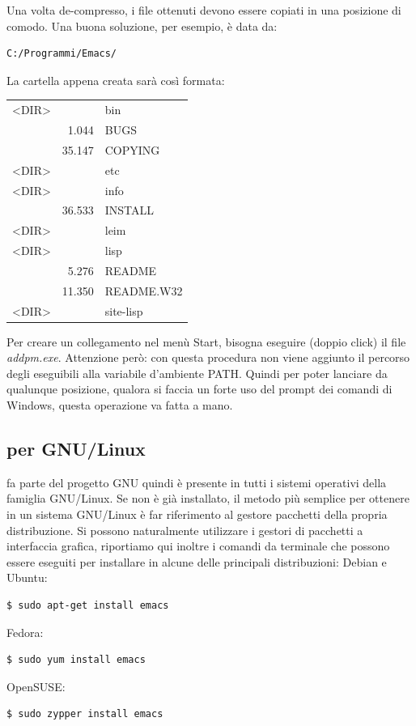 \documentclass[10pt,a4paper]{article}
\begin{document}
Una volta de-compresso, i file ottenuti devono essere copiati in una
posizione di comodo. Una buona soluzione, per esempio, è data da:

\begin{Verbatim}
C:/Programmi/Emacs/
\end{Verbatim}

La cartella appena creata sarà così formata:
\begin{center}\ttfamily
 \begin{tabular}{lrl}
  <DIR>&        & bin       \\
       &  1.044 & BUGS      \\
       & 35.147 & COPYING   \\
  <DIR>&        & etc       \\
  <DIR>&        & info      \\
       & 36.533 & INSTALL   \\
  <DIR>&        & leim      \\
  <DIR>&        & lisp      \\
       &  5.276 & README    \\
       & 11.350 & README.W32\\
  <DIR>&        & site-lisp \\
 \end{tabular}
\end{center}

Per creare un collegamento nel menù \textsf{Start}, bisogna
eseguire (doppio click) il file \emph{addpm.exe}. Attenzione però: con questa
procedura non viene aggiunto il percorso degli eseguibili alla  
variabile d'ambiente \textsf{PATH}. Quindi per poter lanciare 
\emacs{} da qualunque posizione, qualora si faccia un forte uso del prompt dei
comandi di Windows, questa operazione va fatta a mano.

\subsection*{\emacs{} per GNU/Linux}
\label{sec:installlinux}
\emacs{} fa parte del progetto GNU quindi è presente in tutti i sistemi
operativi della famiglia GNU/Linux. Se non è già installato, il metodo più
semplice per ottenere \emacs{} in un sistema GNU/Linux è far riferimento al
gestore pacchetti della propria distribuzione. Si possono naturalmente
utilizzare i gestori di pacchetti a interfaccia grafica, riportiamo qui inoltre
i comandi da terminale che possono essere eseguiti per installare \emacs{} in
alcune delle principali distribuzioni: Debian e Ubuntu:
\begin{Verbatim}
$ sudo apt-get install emacs
\end{Verbatim}
Fedora:
\begin{Verbatim}
$ sudo yum install emacs
\end{Verbatim}
OpenSUSE:
\begin{Verbatim}
$ sudo zypper install emacs
\end{Verbatim}
\end{document}
